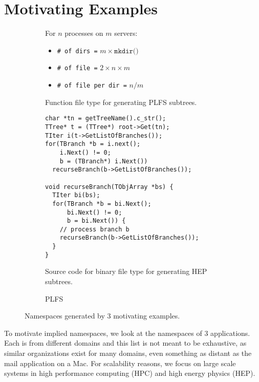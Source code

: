 \section{Motivating Examples}


\begin{figure*}[t]
  \centering
  \begin{subfigure}[b]{.3\linewidth}
      \centering
For \(n\) processes on \(m\) servers:

\begin{itemize}
  \item[] \texttt{\# of dirs =} \(m \times \texttt{mkdir()}\)
  \item[] \texttt{\# of file =} \(2 \times n \times m\)
  \item[] \texttt{\# of file per dir =} \(n/m\)
\end{itemize}
      \caption{Function file type for generating PLFS subtrees.} \label{fig:plfs}
  \end{subfigure}
  \begin{subfigure}[b]{.3\linewidth}
      \centering
      \footnotesize
      \begin{verbatim}
char *tn = getTreeName().c_str();
TTree* t = (TTree*) root->Get(tn);
TIter i(t->GetListOfBranches());
for(TBranch *b = i.next();
    i.Next() != 0;
    b = (TBranch*) i.Next())
  recurseBranch(b->GetListOfBranches());

void recurseBranch(TObjArray *bs) {
  TIter bi(bs); 
  for(TBranch *b = bi.Next();
      bi.Next() != 0;
      b = bi.Next()) {
    // process branch b 
    recurseBranch(b->GetListOfBranches());
  }
} 
      \end{verbatim}
      \caption{Source code for binary file type for generating HEP subtrees.} \label{fig:plfs}
  \end{subfigure}
  \begin{subfigure}[b]{.3\linewidth}
      \centering
      \caption{PLFS} \label{fig:plfs}
  \end{subfigure}
\caption{Namespaces generated by 3 motivating examples.\label{fig:use-cases}}
\end{figure*}

To motivate implied namespaces, we look at the namespaces of 3 applications.
Each is from different domains and this list is not meant to be exhaustive, as
similar organizations exist for many domains, even something as distant as the
mail application on a Mac. For scalability reasons, we focus on large scale
systems in high performance computing (HPC) and high energy physics (HEP).

